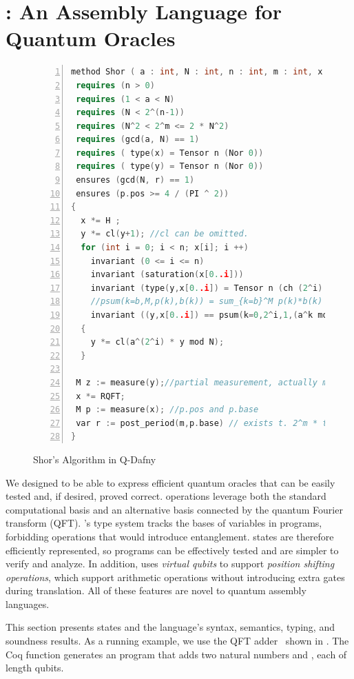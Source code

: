 \section{\oqasm: An Assembly Language for Quantum Oracles}
\label{sec:vqir}

\begin{figure}[t]
{\small
  \begin{lstlisting}[numbers=left,language=C++,xleftmargin=4 mm]
method Shor ( a : int, N : int, n : int, m : int, x : Q[n], y : Q[n] )
 requires (n > 0)
 requires (1 < a < N)
 requires (N < 2^(n-1))
 requires (N^2 < 2^m <= 2 * N^2)
 requires (gcd(a, N) == 1)
 requires ( type(x) = Tensor n (Nor 0))
 requires ( type(y) = Tensor n (Nor 0))
 ensures (gcd(N, r) == 1)
 ensures (p.pos >= 4 / (PI ^ 2))
{
  x *= H ;
  y *= cl(y+1); //cl can be omitted.
  for (int i = 0; i < n; x[i]; i ++)
    invariant (0 <= i <= n)
    invariant (saturation(x[0..i]))
    invariant (type(y,x[0..i]) = Tensor n (ch (2^i) {k | j baseof x[0..i] && k = (a^j mod N,j)}))
    //psum(k=b,M,p(k),b(k)) = sum_{k=b}^M p(k)*b(k)
    invariant ((y,x[0..i]) == psum(k=0,2^i,1,(a^k mod N,k))) 
  {
    y *= cl(a^(2^i) * y mod N);
  }

 M z := measure(y);//partial measurement, actually measure(y,r) r is the period
 x *= RQFT;
 M p := measure(x); //p.pos and p.base
 var r := post_period(m,p.base) // exists t. 2^m * t / r = p.base
}
  \end{lstlisting}
}
\caption{Shor's Algorithm in Q-Dafny}
\label{fig:shorexample}
\end{figure}

We designed \oqasm to be able to express efficient quantum
oracles that can be easily tested and, if desired, proved
correct.
\oqasm operations leverage both the standard
computational basis and an alternative basis connected by the quantum
Fourier transform (QFT). 
\oqasm's type system tracks the bases of variables in
\oqasm programs, forbidding operations that would introduce
entanglement. \oqasm states are therefore efficiently
represented, so programs can be effectively tested and are simpler to
verify and analyze. In addition, \oqasm uses \emph{virtual qubits}
to support \emph{position shifting operations}, which support
arithmetic operations without introducing extra gates during
translation. All of these features are novel to quantum assembly
languages. 

This section presents \oqasm states and the language's syntax,
semantics, typing, and soundness results.  As a running example, we use the QFT
adder~\cite{qft-adder} shown in . The Coq
function  generates an \oqasm program that adds two
natural numbers  and , each of length  qubits.

